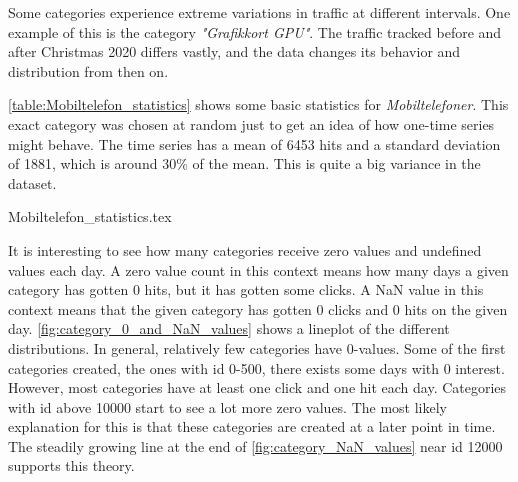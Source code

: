 Some categories experience extreme variations in traffic at different intervals.
One example of this is the category \textit{"Grafikkort GPU"}.
The traffic tracked before and after Christmas 2020 differs vastly,
and the data changes its behavior and distribution from then on.

\autoref{table:Mobiltelefon_statistics} shows some basic statistics for \textit{Mobiltelefoner}.
This exact category was chosen at random just to get an idea of how one-time series might behave.
The time series has a mean of 6453 hits and a standard deviation of 1881, which is
around 30\% of the mean. This is quite a big variance in the dataset.

{Mobiltelefon_statistics.tex}

It is interesting to see how many categories receive zero values and undefined values each day.
A zero value count in this context means how many days a given category has gotten 0 hits, but it has gotten some clicks.
A NaN value in this context means that the given category has gotten 0 clicks and 0 hits on the given day.
\autoref{fig:category_0_and_NaN_values} shows a lineplot of the different distributions.
In general, relatively few categories have 0-values.
Some of the first categories created, the ones with id 0-500, there exists some days with 0 interest.
However, most categories have at least one click and one hit each day.
Categories with id above 10000 start to see a lot more zero values.
The most likely explanation for this is that these categories are created at a later point in time.
The steadily growing line at the end of \autoref{fig:category_NaN_values} near id 12000 supports this theory.
